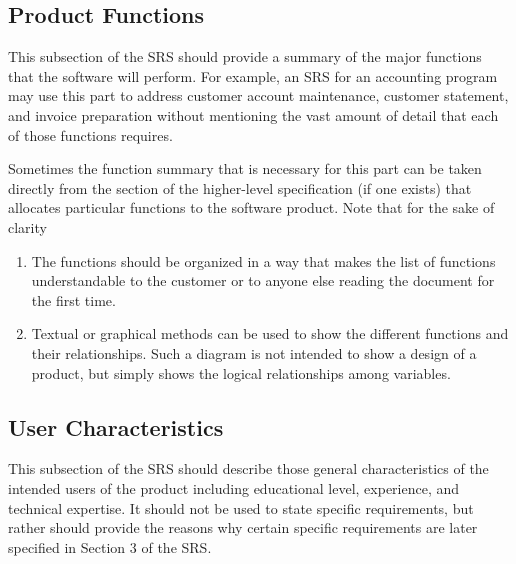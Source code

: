 \documentclass[draftclsnofoot,onecolumn,10pt]{IEEEtran}
\begin{document}
\subsection{Product Functions}
This subsection of the SRS should provide a summary of the major functions that
the software will perform. For example, an SRS for an accounting program may use
this part to address customer account maintenance, customer statement, and
invoice preparation without mentioning the vast amount of detail that each of
those functions requires.\par

Sometimes the function summary that is necessary for this part can be taken
directly from the section of the higher-level specification (if one exists) that
allocates particular functions to the software product. Note that for the sake
of clarity
\begin{enumerate}
	\item The functions should be organized in a way that makes the list of
		functions understandable to the customer or to anyone else reading the
		document for the first time.
	\item Textual or graphical methods can be used to show the different
		functions and their relationships. Such a diagram is not intended to
		show a design of a product, but simply shows the logical relationships
		among variables.
\end{enumerate}

\subsection{User Characteristics}
This subsection of the SRS should describe those general characteristics of the
intended users of the product including educational level, experience, and
technical expertise. It should not be used to state specific requirements, but
rather should provide the reasons why certain specific requirements are later
specified in Section 3 of the SRS.
\end{document}
